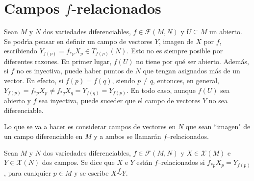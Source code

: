 \documentclass[cursovd_portada.tex]{subfiles}
\begin{document}
\section{Campos $f$-relacionados}
\hs Sean $M$ y $N$ dos variedades diferenciables, $f\in\mathcal{F}(M,N)$ y $U\subseteq M$ un abierto. Se podr\'{\i}a
pensar en definir un campo de vectores $Y$, imagen de $X$ por $f$, escribiendo $Y_{f(p)}=f_{*p}X_p\in
T_{f(p)}(N)$. Esto no es siempre posible por diferentes razones. En primer lugar, $f(U)$ no tiene por qu\'{e} ser
abierto. Adem\'{a}s, si $f$ no es inyectiva, puede haber puntos de $N$ que tengan asignados m\'{a}s de un vector. En
efecto, si $f(p)=f(q)$, siendo $p\neq q$, entonces, en general, $Y_{f(p)}=f_{*p}X_p\neq
f_{*q}X_q=Y_{f(q)}=Y_{f(p)}$. En todo caso, aunque $f(U)$ sea abierto y $f$ sea inyectiva, puede suceder que el
campo de vectores $Y$ no sea diferenciable.
\par
Lo que se va a hacer es considerar campos de vectores en $N$ que sean ``imagen" de un campo diferenciable en $M$ y
a ambos se llamar\'{a}n $f$--relacionados.
\begin{defi}
Sean $M$ y $N$ dos variedades diferenciables, $f\in\mathcal{F}(M,N)$ y $X\in\mathcal{X}(M)$ e $Y\in\mathcal{X}(N)$
dos campos. Se dice que $X$ e $Y$ est\'{a}n $f$--relacionados si $f_{*p}X_p=Y_{f(p)}$, para cualquier $p\in M$ y se
escribe $X\stackrel{f}\sim Y$.
\end{defi}

\newpage
\end{document}
